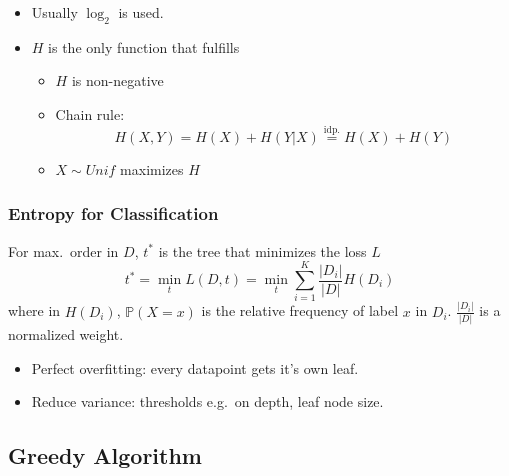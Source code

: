 \begin{itemize}
    \item Usually $\log_2$ is used.
    \item $H$ is the only function that fulfills
          \begin{itemize}
              \item $H$ is non-negative
              \item Chain rule:
                    \noindent\begin{equation*}
                        H(X,Y) = H(X) + H(Y|X) \overset{\mathrm{idp.}}{=} H(X) + H(Y)
                    \end{equation*}
              \item $X\sim Unif$ maximizes $H$
          \end{itemize}
\end{itemize}

\subsubsection{Entropy for Classification}
For max.\ order in $D$, $t^*$ is the tree that minimizes the loss $L$
\noindent\begin{equation*}
    t^* = \min_t L(D,t) =\min_t \sum_{i=1}^{K} \frac{|D_i|}{|D|}H(D_i)
\end{equation*}
where in $H(D_i)$, $\mathbb{P}(X=x)$ is the relative frequency of label $x$ in $D_i$. $\frac{|D_i|}{|D|}$ is a normalized weight.

\newpar{}
\begin{itemize}
    \item Perfect overfitting: every datapoint gets it's own leaf.
    \item Reduce variance: thresholds e.g.\ on depth, leaf node size.
\end{itemize}

\subsection{Greedy Algorithm}

